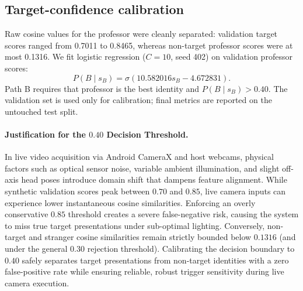 \documentclass{article}
\begin{document}
\subsection{Target-confidence calibration}

Raw cosine values for the professor were cleanly separated: validation target scores ranged from 0.7011 to 0.8465, whereas non-target professor scores were at most 0.1316. We fit logistic regression ($C=10$, seed 402) on validation professor scores:
\begin{equation}
  P(B\mid s_B)=\sigma(10.582016s_B-4.672831).
\end{equation}
Path B requires that professor is the best identity and $P(B\mid s_B)>0.40$. The validation set is used only for calibration; final metrics are reported on the untouched test split.

\paragraph{Justification for the $0.40$ Decision Threshold.}
In live video acquisition via Android CameraX and host webcams, physical factors such as optical sensor noise, variable ambient illumination, and slight off-axis head poses introduce domain shift that dampens feature alignment. While synthetic validation scores peak between $0.70$ and $0.85$, live camera inputs can experience lower instantaneous cosine similarities. Enforcing an overly conservative $0.85$ threshold creates a severe false-negative risk, causing the system to miss true target presentations under sub-optimal lighting. Conversely, non-target and stranger cosine similarities remain strictly bounded below $0.1316$ (and under the general $0.30$ rejection threshold). Calibrating the decision boundary to $0.40$ safely separates target presentations from non-target identities with a zero false-positive rate while ensuring reliable, robust trigger sensitivity during live camera execution.
\end{document}

